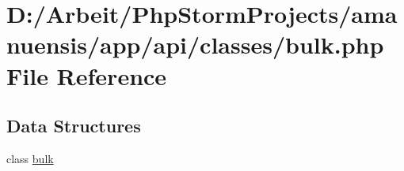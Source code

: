 \hypertarget{a00053}{}\section{D\+:/\+Arbeit/\+Php\+Storm\+Projects/amanuensis/app/api/classes/bulk.php File Reference}
\label{a00053}
\subsection*{Data Structures}
\begin{DoxyCompactItemize}
\item 
class \hyperlink{a00014}{bulk}
\end{DoxyCompactItemize}
